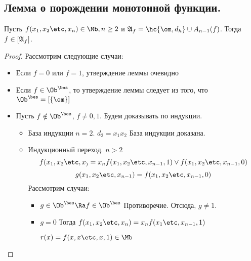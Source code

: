 \documentclass[unicode, 10pt, a4paper, oneside, fleqn]{article}
\begin{document}
\subsection{Лемма о порождении монотонной функции.}
\begin{lemma}
  Пусть $f(\set[x]{n}) \in \Mb, n \ge 2$ и $\ag_f=\hc{\om,d_h}\cup A_{n-1}(f)$. 
  Тогда $f \in [\mathfrak{A}_f]$.
\end{lemma}
\begin{proof}
  Рассмотрим следующие случаи:
  \begin{itemize}
    \item 
      Если $f=0$ или $f=1$, утверждение леммы очевидно
    \item 
      Если $f \in \Oib$, то утверждение леммы следует из того, что
      \begin{math}
        \Oib=\cls{\om}
      \end{math}
    \item 
      Пусть $f \notin \Oib$, $f\ne 0,1$. Будем доказывать по индукции.
      \begin{itemize}
        \item{База индукции $n=2$.} 
          $d_2 = x_1x_2$ База индукции доказана.
        \item{Индукционный переход. $n>2$}
          \begin{displaymath}
            f(\set[x]) = x_nf(\set[x]{n-1},1)\vee f(\set[x]{n-1},0)
          \end{displaymath}
          \begin{displaymath}
            g(x_1,x_2\etc,x_{n-1}) = f(x_1,x_2\etc,x_{n-1},0)
          \end{displaymath}
          Рассмотрим случаи:\\
          \begin{itemize}
            \item 
              \begin{math}
                g \in \Oib \Ra f \in \Oib
              \end{math}
              Противоречие. Отсюда, \WHY $g \ne 1$.
            \item {$g = 0$} Тогда 
              \begin{math}
                f(\set[x]{n})=x_nf(\seti[x]{1}{n-1},1)
              \end{math}
              \begin{denote}
                \begin{math}
                  r(x)=f(x,x\etc,x,1) \in \Mb
                \end{math}

\end{denote}
\end{itemize}
\end{itemize}
\end{itemize}
\end{proof}
\end{document}
